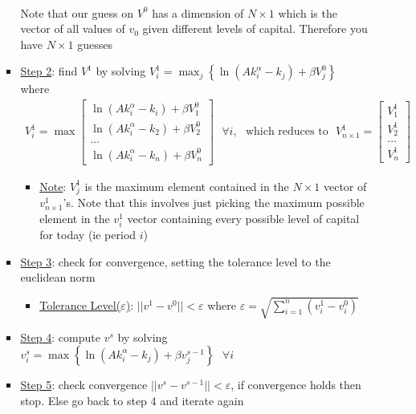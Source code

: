 \documentclass{article}
\begin{document}
\begin{itemize}
\begin{itemize}
\begin{itemize}
\begin{gather*}
            \end{gather*}
            Note that our guess on $V^{0}$ has a dimension of $N \times 1$ which is the vector of all values of $v_{0}$ given different levels of capital. Therefore you have $N \times 1$ guesses
            \item \underline{Step 2}: find $V^{1}$ by solving $V_{i}^{1}=\max_{j} \left\{ \ln(Ak_{i}^{\alpha} - k_{j}) + \beta V_{j}^{0} \right\}$ where
            \begin{gather*}
                V_{i}^{1} = \max \begin{bmatrix} \ln(Ak_{i}^{\alpha} - k_{i}) + \beta V_{1}^{0} \\ \ln(Ak_{i}^{\alpha} - k_{2}) + \beta V_{2}^{0} \\ \dots \\ \ln(Ak_{i}^{\alpha} - k_{n}) + \beta V_{n}^{0} \end{bmatrix} \ \ \ \forall i, \ \ \ \text{which reduces to} \ \ \ V_{n \times 1}^{1} = \begin{bmatrix} V_{1}^{1} \\ V_{2}^{1} \\ \dots \\ V_{n}^{1} \end{bmatrix}
            \end{gather*}
            \begin{itemize}
                \item \underline{Note}: $V_{j}^{1}$ is the maximum element contained in the  $N \times 1$ vector of $v_{n \times 1}^{1}$'s. Note that this involves just picking the maximum possible element in the $v_{i}^{1}$ vector containing every possible level of capital for today (ie period $i$)
            \end{itemize}
            \item \underline{Step 3}: check for convergence, setting the tolerance level to the euclidean norm
            \begin{itemize}
                \item \underline{Tolerance Level($\varepsilon$)}: $||v^{1} - v^{0}||< \varepsilon$ where $\varepsilon = \sqrt{\sum_{i=1}^{n}(v_{i}^{1}-v_{i}^{0})}$
            \end{itemize}
            \item  \underline{Step 4}: compute $v^{s}$ by solving $v_{i}^{s} = \max \left\{ \ln(Ak_{i}^{\alpha} - k_{j}) + \beta v_{j}^{s-1} \right\} \ \ \ \forall i$
            \item  \underline{Step 5}: check convergence $||v^{s} - v^{s-1}||< \varepsilon$, if convergence holds then stop. Else go back to step 4 and iterate again
        \end{itemize}
    \end{itemize}
\end{itemize}
\end{document}
